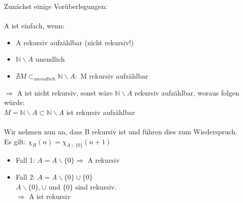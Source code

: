 \documentclass[a4paper]{scrartcl}%
\begin{document}
    Zunächst einige Vorüberlegungen:\\
    \\A ist einfach, wenn:\\
    \begin{itemize}
        \item A rekursiv aufzählbar (nicht rekursiv!)\\
        \item $ \mathds{N}\backslash A$ unendlich\\
        \item $\nexists M \subset_{unendlich} \mathds{N} \backslash A:$ M rekursiv aufzählbar\\
    \end{itemize}
    $\Rightarrow$ A ist nicht rekursiv, sonst wäre $ \mathds{N} \backslash A$ rekursiv aufzählbar, woraus folgen würde:\\
    $M = \mathds{N} \backslash A \subset \mathds{N} \backslash A$ ist rekursiv aufzählbar \lightning\\
    \\Wir nehmen nun an, dass B rekursiv ist und führen dies zum Wiederspruch.\\
    Es gilt: $\chi_B(n) = \chi_{A\backslash \{0\}}(n+1)$\\

    \begin{itemize}
        \item Fall 1: $A = A \backslash \{0\} \Rightarrow$ A rekursiv \lightning\\
        \item Fall 2: $A = A \backslash \{0\} \cup  \{0\}$\\
            $A \backslash \{0\}, \cup \text{ und } \{0\}$ sind rekursiv.\\
            $\Rightarrow$ A ist rekursiv \lightning\\
    \end{itemize}%
\end{document}
